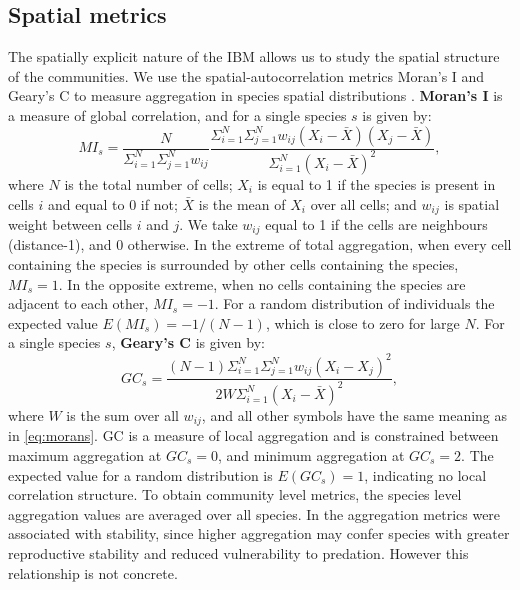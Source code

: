 \subsection{Spatial metrics}
\label{sec:def_spatial_metrics}

The spatially explicit nature of the IBM allows us to study the spatial structure of the communities. We use the spatial-autocorrelation metrics Moran's I and Geary's C to measure aggregation in species spatial distributions \cite{dale2014spatial, lurgi2015effects}. \textbf{Moran's I} is a measure of global correlation, and for a single species $s$ is given by:
\begin{equation}
MI_s = \frac{N}{\Sigma_{i=1}^N \Sigma_{j=1}^N w_{ij}}  \frac{\Sigma_{i=1}^N \Sigma_{j=1}^N w_{ij}(X_i - \bar{X})(X_j - \bar{X})}{\Sigma_{i=1}^N (X_i - \bar{X})^2},
\label{eq:morans}
\end{equation}
%
where $N$ is the total number of cells; $X_i$ is equal to 1 if the species is present in cells $i$ and equal to 0 if not; $\bar{X}$ is the mean of $X_i$ over all cells; and $w_{ij}$ is spatial weight between cells $i$ and $j$. We take $w_{ij}$ equal to 1 if the cells are neighbours (distance-1), and 0 otherwise. In the extreme of total aggregation, when every cell containing the species is surrounded by other cells containing the species, $MI_s=1$. In the opposite extreme, when no cells containing the species are adjacent to each other, $MI_s=-1$. For a random distribution of individuals the expected value $E(MI_s) = -1/(N-1)$, which is close to zero for large $N$. For a single species $s$, \textbf{Geary's C} is given by:
\begin{equation}
GC_s = \frac{(N-1)\Sigma_{i=1}^N \Sigma_{j=1}^N w_{ij}(X_i - X_j)^2}{2W \Sigma_{i=1}^N (X_i - \bar{X})^2},
\label{eq:gearys}
\end{equation}
%
where $W$ is the sum over all $w_{ij}$, and all other symbols have the same meaning as in \eqref{eq:morans}. GC is a measure of local aggregation and is constrained between maximum aggregation at $GC_s=0$, and minimum aggregation at $GC_s=2$. The expected value for a random distribution is $E(GC_s)=1$, indicating no local correlation structure. To obtain community level metrics, the species level aggregation values are averaged over all species. In \cite{lurgi2015effects} the aggregation metrics were associated with stability, since higher aggregation may confer species with greater reproductive stability and reduced vulnerability to predation. However this relationship is not concrete.

